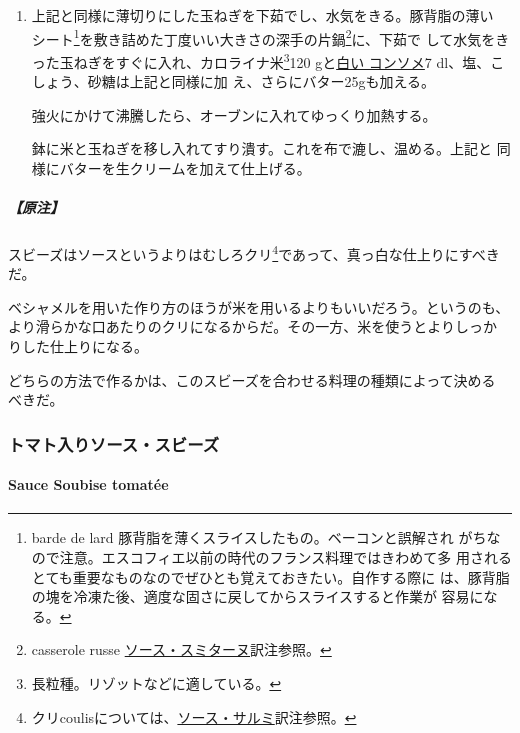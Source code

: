 \begin{recette}
\begin{enumerate}
\def\labelenumi{\arabic{enumi}.}
\setcounter{enumi}{1}
\item
  上記と同様に薄切りにした玉ねぎを下茹でし、水気をきる。豚背脂の薄い
  シート\footnote{barde de lard
    豚背脂を薄くスライスしたもの。ベーコンと誤解され
    がちなので注意。エスコフィエ以前の時代のフランス料理ではきわめて多
    用されるとても重要なものなのでぜひとも覚えておきたい。自作する際に
    は、豚背脂の塊を冷凍た後、適度な固さに戻してからスライスすると作業が
    容易になる。}を敷き詰めた丁度いい大きさの深手の片鍋\footnote{casserole
    russe
    \protect\hyperlink{sauce-smitane}{ソース・スミターヌ}訳注参照。}に、下茹で
  して水気をきった玉ねぎをすぐに入れ、カロライナ米\footnote{長粒種。リゾットなどに適している。}120
  gと\protect\hyperlink{consomme-blanc}{白い コンソメ}7
  dl、塩、こしょう、砂糖は上記と同様に加 え、さらにバター25gも加える。

  強火にかけて沸騰したら、オーブンに入れてゆっくり加熱する。

  鉢に米と玉ねぎを移し入れてすり潰す。これを布で漉し、温める。上記と
  同様にバターを生クリームを加えて仕上げる。
\end{enumerate}

\hypertarget{ux539fux6ce8-18}{%
\subparagraph{【原注】}\label{ux539fux6ce8-18}}

スビーズはソースというよりはむしろクリ\footnote{クリcoulisについては、\protect\hyperlink{sauce-salmis}{ソース・サルミ}訳注参照。}であって、真っ白な仕上りにすべきだ。

ベシャメルを用いた作り方のほうが米を用いるよりもいいだろう。というのも、
より滑らかな口あたりのクリになるからだ。その一方、米を使うとよりしっか
りした仕上りになる。

どちらの方法で作るかは、このスビーズを合わせる料理の種類によって決める
べきだ。

\maeaki

\hypertarget{ux30c8ux30deux30c8ux5165ux308aux30bdux30fcux30b9ux30b9ux30d3ux30fcux30ba}{%
\subsubsection{トマト入りソース・スビーズ}\label{ux30c8ux30deux30c8ux5165ux308aux30bdux30fcux30b9ux30b9ux30d3ux30fcux30ba}}

\hypertarget{sauce-soubise-tomatuxe9e}{%
\paragraph{Sauce Soubise tomatée}\label{sauce-soubise-tomatuxe9e}}


\end{recette}
